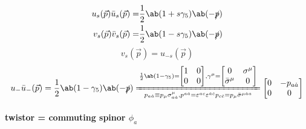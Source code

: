 \documentclass{article}
\newcommand{\bmat}[1]{\begin{bmatrix}#1\end{bmatrix}}
\newcommand{\gammafive}{\gamma_5}
\newcommand{\gammamu}{\gamma^{\mu}}
\newcommand{\slashedp}{\slashed{p}}
\newcommand{\vecp}{\vec{p}}
\newcommand{\xleq}{\xlongequal}
\begin{document}
\begin{align*}
    u_s(\vecp) \bar{u}_s(\vecp) = & \frac{1}{2} \ab(1 + s \gammafive) \ab(- \slashedp) \\
    v_s(\vecp) \bar{v}_s(\vecp) = & \frac{1}{2} \ab(1 - s \gammafive) \ab(- \slashedp)
\end{align*}
\[ v_s(\vecp) = u_{-s}(\vecp) \]
\[ u_{-} \bar{u}_{-}(\vec{p}) = \frac{1}{2} \ab(1- \gammafive) \ab(- \slashedp) \xleq[p_{a\dot{a}} \equiv p_{\mu} \sigma^{\mu}_{a\dot{a}}, p^{a\dot{a}} = \varepsilon^{ac} \varepsilon^{\dot{a}\dot{c}} p_{c\dot{c}} = p_{\mu} \bar{\sigma}^{\mu \dot{a} a}]{\frac{1}{2} \ab(1- \gammafive) = \bmat{1 & 0 \\ 0 & 0}, \gammamu = \bmat{0 & \sigma^{\mu} \\ \bar{\sigma}^{\mu} & 0}} \bmat{0 & - p_{a\dot{a}} \\ 0 & 0} \]

\paragraph{twistor = commuting spinor $\phi_a$}
\end{document}
